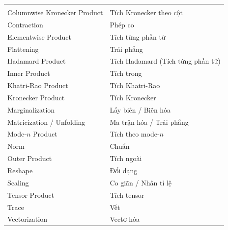 \begin{longtable}{L{0.42\textwidth}L{0.48\textwidth}}
\addlinespace
{} \\
Columnwise Kronecker Product & Tích Kronecker theo cột \\
Contraction & Phép co \\
Elementwise Product & Tích từng phần tử \\
Flattening & Trải phẳng \\
Hadamard Product & Tích Hadamard (Tích từng phần tử) \\
Inner Product & Tích trong \\
Khatri-Rao Product & Tích Khatri-Rao \\
Kronecker Product & Tích Kronecker \\
Marginalization & Lấy biên / Biên hóa \\
Matricization / Unfolding & Ma trận hóa / Trải phẳng \\
Mode-$n$ Product & Tích theo mode-$n$ \\
Norm & Chuẩn \\
Outer Product & Tích ngoài \\
Reshape & Đổi dạng \\
Scaling & Co giãn / Nhân tỉ lệ \\
Tensor Product & Tích tensor \\
Trace & Vết \\
Vectorization & Vectơ hóa \\


\end{longtable}
